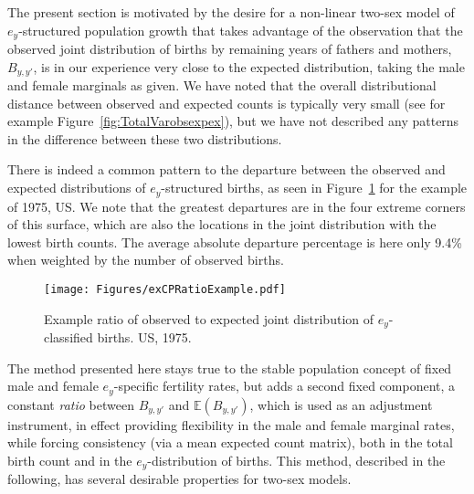 \FloatBarrier
\label{sec:CRchap}
The present section is motivated by the desire for a non-linear two-sex model of
$e_y$-structured population growth that takes advantage of the observation that
the observed joint distribution of births by remaining years of fathers 
and mothers, $B_{y,y'}$, is in our experience very close to the expected
distribution, taking the male and female marginals as given. We have noted 
that the overall distributional distance
between observed and expected counts is typically very small (see for example
Figure~\ref{fig:TotalVarobsexpex}), but we have not described any patterns 
in the difference between these two distributions. 

There is indeed a common pattern to the departure between the observed and
expected distributions of $e_y$-structured births, as seen in Figure~\ref{fig:exCPratioexample} for
the example of 1975, US. We note that the greatest departures are in the four
extreme corners of this surface, which are also the locations in the joint distribution 
with the lowest birth counts. The average absolute departure percentage is here
only 9.4\% when weighted by the number of observed births.

\begin{figure}[!ht]
  \centering
    \caption{Example ratio of observed to expected joint distribution of
    $e_y$-classified births. US, 1975.}
     \texttt{[image: Figures/exCPRatioExample.pdf]}
     \label{fig:exCPratioexample}
\end{figure}

The method presented here stays true to the stable population concept
 of fixed male and female $e_y$-specific fertility rates, but adds a second
 fixed component, a constant \textit{ratio} between $B_{y,y'}$ and
 $\mathbb{E}(B_{y,y'})$, which is used as an adjustment instrument, in
 effect providing flexibility in the male and female marginal rates, while forcing
 consistency (via a mean expected count matrix), both in the total birth count
 and in the $e_y$-distribution of births. This method, described in the
 following, has several desirable properties for two-sex models.
 
\FloatBarrier


